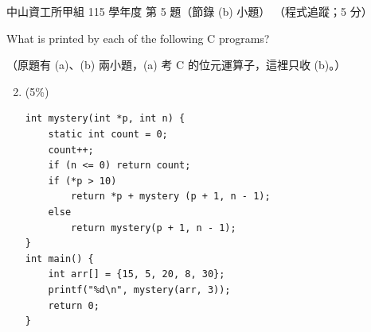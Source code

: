 \begin{pastexam}[label={px:nsysu-115-osds-01}]{中山資工所甲組 115 學年度 第 5 題（節錄 (b) 小題）}
（程式追蹤；5 分）

What is printed by each of the following C programs?

（原題有 (a)、(b) 兩小題，(a) 考 C 的位元運算子，這裡只收 (b)。）
\begin{enumerate}[label=(\alph*)]
\setcounter{enumi}{1}
\item (5\%)
\begin{verbatim}
int mystery(int *p, int n) {
    static int count = 0;
    count++;
    if (n <= 0) return count;
    if (*p > 10)
        return *p + mystery (p + 1, n - 1);
    else
        return mystery(p + 1, n - 1);
}
int main() {
    int arr[] = {15, 5, 20, 8, 30};
    printf("%d\n", mystery(arr, 3));
    return 0;
}
\end{verbatim}
\end{enumerate}
\end{pastexam}


